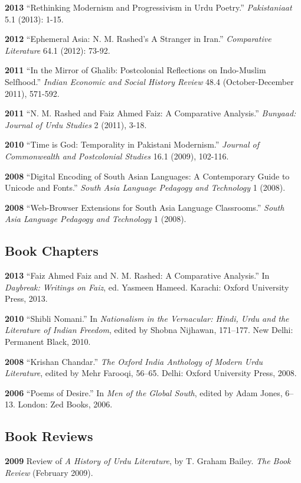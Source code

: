 \documentclass[letterpaper,12pt]{article}
\begin{document}
\textbf{2013}
“Rethinking Modernism and Progressivism in Urdu Poetry.”
\emph{Pakistaniaat} 5.1 (2013): 1-15.

\textbf{2012}
“Ephemeral Asia: N. M. Rashed’s A Stranger in Iran.”
\emph{Comparative Literature} 64.1 (2012): 73-92.

\textbf{2011}
“In the Mirror of Ghalib: Postcolonial Reflections on Indo-Muslim Selfhood.”
\emph{Indian Economic and Social History Review} 48.4 (October-December 2011), 571-592.

\textbf{2011}
“N. M. Rashed and Faiz Ahmed Faiz: A Comparative Analysis.”
\emph{Bunyaad: Journal of Urdu Studies}  2 (2011), 3-18.

\textbf{2010}
“Time is God: Temporality in Pakistani Modernism.”
\emph{Journal of Commonwealth and Postcolonial Studies} 16.1 (2009), 102-116.

\textbf{2008}
“Digital Encoding of South Asian Languages: A Contemporary Guide to Unicode and Fonts.”
\emph{South Asia Language Pedagogy and Technology} 1 (2008).

\textbf{2008}
“Web-Browser Extensions for South Asia Language Classrooms.”
\emph{South Asia Language Pedagogy and Technology} 1 (2008).


\subsection{Book Chapters%
  \label{book-chapters}%
}

\textbf{2013}
“Faiz Ahmed Faiz and N. M. Rashed: A Comparative Analysis.”
In \emph{Daybreak: Writings on Faiz},
ed. Yasmeen Hameed.
Karachi: Oxford University Press, 2013.

\textbf{2010}
“Shibli Nomani.”
In \emph{Nationalism in the Vernacular:
Hindi, Urdu and the Literature of Indian Freedom},
edited by Shobna Nijhawan,
171–177.
New Delhi: Permanent Black, 2010.

\textbf{2008} “Krishan Chandar.”
\emph{The Oxford India Anthology of Modern Urdu Literature},
edited by Mehr Farooqi, 56–65.
Delhi: Oxford University Press, 2008.

\textbf{2006}
“Poems of Desire.”
In \emph{Men of the Global South},
edited by Adam Jones,
6–13.
London: Zed Books, 2006.


\subsection{Book Reviews%
  \label{book-reviews}%
}

\textbf{2009}
Review of \emph{A History of Urdu Literature},
by T. Graham Bailey.
\emph{The Book Review} (February 2009).
\end{document}
